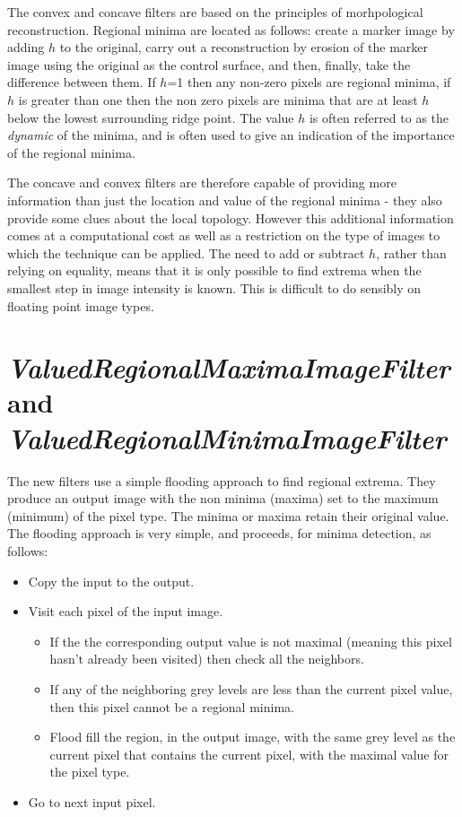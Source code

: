 \documentclass{InsightArticle}
\begin{document}
The convex and concave filters are based on the principles of
morhpological reconstruction. Regional minima are located as follows:
create a marker image by adding $h$ to the original, carry out a
reconstruction by erosion of the marker image using the original as
the control surface, and then, finally, take the difference between
them. If $h$=1 then any non-zero pixels are regional minima, if $h$ is
greater than one then the non zero pixels are minima that are at least
$h$ below the lowest surrounding ridge point. The value $h$ is often
referred to as the {\em dynamic} of the minima, and is often used to
give an indication of the importance of the regional minima.

The concave and convex filters are therefore capable of providing more
information than just the location and value of the regional minima -
they also provide some clues about the local topology. However this
additional information comes at a computational cost as well as a
restriction on the type of images to which the technique can be
applied. The need to add or subtract $h$, rather than relying on
equality, means that it is only possible to find extrema when the
smallest step in image intensity is known. This is difficult to do
sensibly on floating point image types.

\section{{\em ValuedRegionalMaximaImageFilter} and {\em ValuedRegionalMinimaImageFilter}}
The new filters use a simple flooding approach to find regional
extrema. They produce an output image with the non minima (maxima) set
to the maximum (minimum) of the pixel type. The minima or maxima
retain their original value. 
The flooding approach is very simple, and proceeds, for minima detection, as follows:
\begin{itemize}
\item Copy the input to the output.
\item Visit each pixel of the input image. 
   \begin{itemize}	
   \item If the the corresponding output 
	 value is not maximal (meaning this pixel hasn't already been
      visited) then check all the neighbors. 
    \item If any of the neighboring grey levels are less than the current pixel 
      value, then this pixel cannot be a regional minima.
    \item Flood fill the region, in the output image, with the same grey level 
      as the current pixel that contains the current pixel, with the
      maximal value for the pixel type.
    \end{itemize}
\item Go to next input pixel.
\end{itemize}
\end{document}
